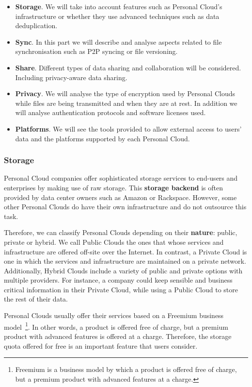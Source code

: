 {\begin{itemize}
\item \textbf{Storage}. We will take into account features such as Personal Cloud's infrastructure or whether they use advanced techniques such as data deduplication.
\item \textbf{Sync}. In this part we will describe and analyse aspects related to file synchronisation such as P2P syncing or file versioning. 
\item \textbf{Share}. Different types of data sharing and collaboration will be considered. Including privacy-aware data sharing.
\item \textbf{Privacy}. We will analyse the type of encryption used by Personal Clouds while files are being transmitted and when they are at rest. In addition we will analyse authentication protocols and software licenses used.
\item \textbf{Platforms}. We will see the tools provided to allow external access to users' data and the platforms supported by each Personal Cloud.
\end{itemize}


\subsubsection{Storage}

Personal Cloud companies offer sophisticated storage services to end-users and enterprises by making use of raw storage. This \textbf{storage backend} is often provided by data center owners such as Amazon or Rackspace. However, some other Personal Clouds do have their own infrastructure and do not outsource this task.

Therefore, we can classify Personal Clouds depending on their \textbf{nature}: public, private or hybrid. We call Public Clouds the ones that whose services and infrastructure are offered off-site over the Internet. In contrast, a Private Cloud is one in which the services and infrastructure are maintained on a private network. Additionally, Hybrid Clouds include a variety of public and private options with multiple providers. For instance, a company could keep sensible and business critical information in their Private Cloud, while using a Public Cloud to store the rest of their data.

Personal Clouds usually offer their services based on a Freemium business model~\footnote{Freemium is a business model by which a product is offered free of charge, but a premium product with advanced features at a charge.}. In other words, a product is offered free of charge, but a premium product with advanced features is offered at a charge. Therefore, the storage quota offered for free is an important feature that users consider.

}
